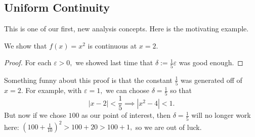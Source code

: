 \documentclass[../notes.tex]{subfiles}
\begin{document}
\subsection{Uniform Continuity}
This is one of our first, new analysis concepts. Here is the motivating example.
\begin{exercise}
	We show that $f(x)=x^2$ is continuous at $x=2.$
\end{exercise}
\begin{proof}
	For each $\varepsilon>0,$ we showed last time that $\delta:=\frac15\varepsilon$ was good enough.
\end{proof}
Something funny about this proof is that the constant $\frac15$ was generated off of $x=2.$ For example, with $\varepsilon=1,$ we can choose $\delta=\frac15$ so that
\[|x-2|<\frac15\implies\left|x^2-4\right|<1.\]
But now if we chose $100$ as our point of interest, then $\delta=\frac15$ will no longer work here: $\left(100+\frac1{10}\right)^2>100+20>100+1,$ so we are out of luck.
\end{document}
